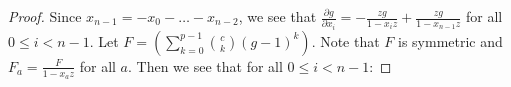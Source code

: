 \documentclass{article}
\numberwithin{equation}{section}
\begin{document}
\begin{proof}
%
%

Since $x_{n-1}=-x_0-\dots-x_{n-2}$, we see that $\frac{\partial g}{\partial x_i}=-\frac{zg}{1-x_iz}+\frac{zg}{1-x_{n-1}z}$ for all $0 \le i < n-1$. Let $F =\left(\sum_{k=0}^{p-1} \binom{c}{k} (g-1)^k\right)$. Note that $F$ is symmetric and $F_a=\frac{F}{1-x_az}$ for all $a$. Then we see that for all $0 \le i < n-1$:


\end{proof}
\end{document}
